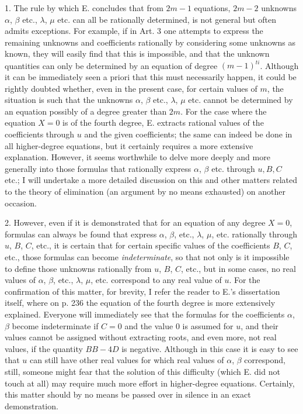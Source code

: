 \documentclass[12pt]{memoir}
\theoremstyle{plain}
\theoremstyle{remark}
\begin{document}
1. The rule by which \textsc{E.} concludes that from \(2m-1\) equations, \(2m-2\) unknowns \(\alpha\), \(\beta\) etc., \(\lambda\), \(\mu\) etc. can all be rationally determined, is not general but often admits exceptions. For example, if in Art. 3 one attempts to express the remaining unknowns and coefficients rationally by considering some unknowns as known, they will easily find that this is impossible, and that the unknown quantities can only be determined by an equation of degree \((m-1)^{ti}\). Although it can be immediately seen a priori that this must necessarily happen, it could be rightly doubted whether, even in the present case, for certain values of \(m\), the situation is such that the unknowns \(\alpha\), \(\beta\) etc., \(\lambda\), \(\mu\) etc. cannot be determined by an equation possibly of a degree greater than \(2m\). For the case where the equation \(X = 0\) is of the fourth degree, \textsc{E.} extracts rational values of the coefficients through \(u\) and the given coefficients; the same can indeed be done in all higher-degree equations, but it certainly requires a more extensive explanation. However, it seems worthwhile to delve more deeply and more generally into those formulas that rationally express \(\alpha\), \(\beta\) etc. through \(u, B, C\) etc.; I will undertake a more detailed discussion on this and other matters related to the theory of elimination (an argument by no means exhausted) on another occasion.

2. However, even if it is demonstrated that for an equation of any degree \(X = 0\), formulas can always be found that express \(\alpha\), \(\beta\), etc., \(\lambda\), \(\mu\), etc. rationally through \(u\), \(B\), \(C\), etc., it is certain that for certain specific values of the coefficients \(B\), \(C\), etc., those formulas can become \textit{indeterminate}, so that not only is it impossible to define those unknowns rationally from \(u\), \(B\), \(C\), etc., but in some cases, no real values of \(\alpha\), \(\beta\), etc., \(\lambda\), \(\mu\), etc. correspond to any real value of \(u\). For the confirmation of this matter, for brevity, I refer the reader to \textsc{E.}'s dissertation itself, where on p. 236 the equation of the fourth degree is more extensively explained. Everyone will immediately see that the formulas for the coefficients \(\alpha\), \(\beta\) become indeterminate if \(C = 0\) and the value \(0\) is assumed for \(u\), and their values cannot be assigned without extracting roots, and even more, not real values, if the quantity \(BB-4D\) is negative. Although in this case it is easy to see that \(u\) can still have other real values for which real values of \(\alpha\), \(\beta\) correspond, still, someone might fear that the solution of this difficulty (which \textsc{E.} did not touch at all) may require much more effort in higher-degree equations. Certainly, this matter should by no means be passed over in silence in an exact demonstration.
\end{document}
